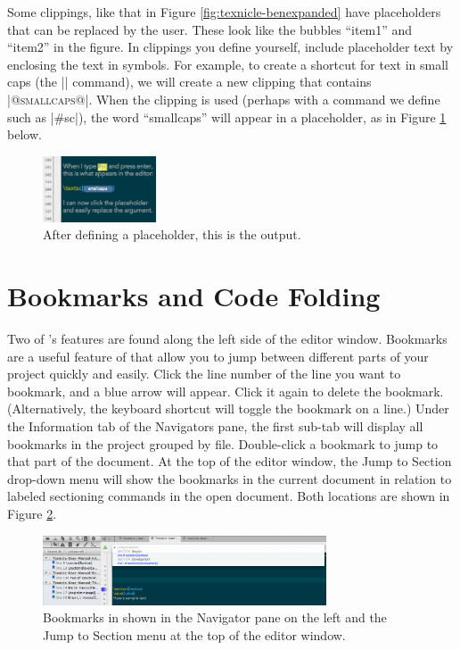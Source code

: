Some clippings, like that in Figure \ref{fig:texnicle-benexpanded} have placeholders that can be replaced by the user. These look like the bubbles ``item1'' and ``item2'' in the figure. In clippings you define yourself, include placeholder text by enclosing the text in \@ symbols. For example, to create a shortcut for text in small caps (the |\smallcaps| command), we will create a new clipping that contains |\textsc{@smallcaps@}|. When the clipping is used (perhaps with a command we define such as |#sc|), the word ``smallcaps'' will appear in a placeholder, as in Figure \ref{fig:texnicle-customclipplaceholder} below.
\begin{figure}[htbp]
\centering
\includegraphics[width=0.3\textwidth]{TeXnicle-Images/texnicle-customclipplaceholder.png}
\caption{After defining a placeholder, this is the output.}
\label{fig:texnicle-customclipplaceholder}
\end{figure}

\section{Bookmarks and Code Folding}
\label{reference.bookmarksfolding}
Two of \texnicle's features are found along the left side of the editor window. Bookmarks are a useful feature of \texnicle that allow you to jump between different parts of your project quickly and easily. Click the line number of the line you want to bookmark, and a blue arrow will appear. Click it again to delete the bookmark. (Alternatively, the keyboard shortcut  will toggle the bookmark on a line.) Under the Information tab of the Navigators pane, the first sub-tab will display all bookmarks in the project grouped by file. Double-click a bookmark to jump to that part of the document. At the top of the editor window, the Jump to Section drop-down menu will show the bookmarks in the current document in relation to labeled sectioning commands in the open document. Both locations are shown in Figure \ref{fig:texnicle-bookmarks}.
\begin{figure}[htbp]
\centering
\includegraphics[width=0.75\textwidth]{TeXnicle-Images/texnicle-bookmarks.png}
\caption{Bookmarks in \texnicle shown in the Navigator pane on the left and the Jump to Section menu at the top of the editor window.}
\label{fig:texnicle-bookmarks}
\end{figure}

